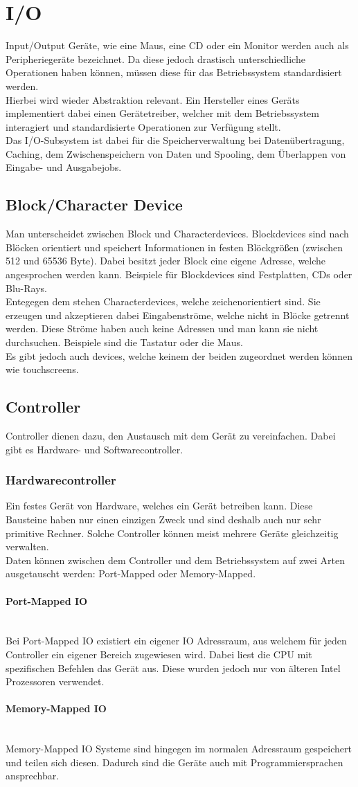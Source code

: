 \documentclass{article}
\newcommand{\paragraphlb}[1]{\paragraph{#1}\mbox{}\\}
\begin{document}
	\section{I/O}
	Input/Output Geräte, wie eine Maus, eine CD oder ein Monitor werden auch als Peripheriegeräte bezeichnet. Da diese jedoch drastisch unterschiedliche Operationen haben können, müssen diese für das Betriebssystem standardisiert werden. \\
	Hierbei wird wieder Abstraktion relevant. Ein Hersteller eines Geräts implementiert dabei einen Gerätetreiber, welcher mit dem Betriebssystem interagiert und standardisierte Operationen zur Verfügung stellt. \\
	Das I/O-Subsystem ist dabei für die Speicherverwaltung bei Datenübertragung, Caching, dem Zwischenspeichern von Daten und Spooling, dem Überlappen von Eingabe- und Ausgabejobs. \\
	\subsection{Block/Character Device}
	Man unterscheidet zwischen Block und Characterdevices. Blockdevices sind nach Blöcken orientiert und speichert Informationen in festen Blöckgrößen (zwischen 512 und 65536 Byte). Dabei besitzt jeder Block eine eigene Adresse, welche angesprochen werden kann. Beispiele für Blockdevices sind Festplatten, CDs oder Blu-Rays. \\
	Entegegen dem stehen Characterdevices, welche zeichenorientiert sind. Sie erzeugen und akzeptieren dabei Eingabenströme, welche nicht in Blöcke getrennt werden. Diese Ströme haben auch keine Adressen und man kann sie nicht durchsuchen. Beispiele sind die Tastatur oder die Maus. \\
	Es gibt jedoch auch devices, welche keinem der beiden zugeordnet werden können wie touchscreens. \\
	\subsection{Controller}
	Controller dienen dazu, den Austausch mit dem Gerät zu vereinfachen. Dabei gibt es Hardware- und Softwarecontroller.
	\subsubsection{Hardwarecontroller}
	Ein festes Gerät von Hardware, welches ein Gerät betreiben kann. Diese Bausteine haben nur einen einzigen Zweck und sind deshalb auch nur sehr primitive Rechner. Solche Controller können meist mehrere Geräte gleichzeitig verwalten. \\
	Daten können zwischen dem Controller und dem Betriebssystem auf zwei Arten ausgetauscht werden: Port-Mapped oder Memory-Mapped.\\
	\paragraphlb{Port-Mapped IO}
	Bei Port-Mapped IO existiert ein eigener IO Adressraum, aus welchem für jeden Controller ein eigener Bereich zugewiesen wird. Dabei liest die CPU mit spezifischen Befehlen das Gerät aus. Diese wurden jedoch nur von älteren Intel Prozessoren verwendet.
	\paragraphlb{Memory-Mapped IO}
	Memory-Mapped IO Systeme sind hingegen im normalen Adressraum gespeichert und teilen sich diesen. Dadurch sind die Geräte auch mit Programmiersprachen ansprechbar.
\end{document}
